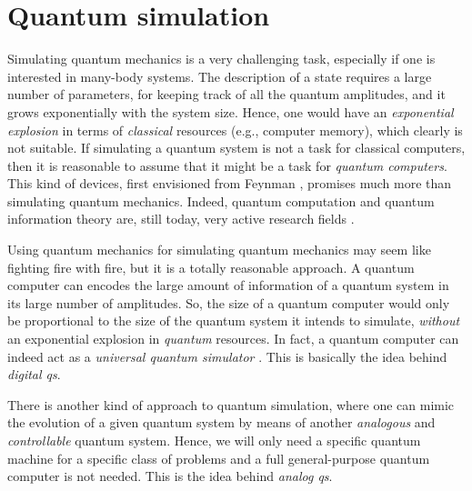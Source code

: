 \section{Quantum simulation}
\label{sec:quantum_simulation}

Simulating quantum mechanics is a very challenging task, especially if one is interested in many-body systems.
The description of a state requires a large number of parameters, for keeping track of all the quantum amplitudes, and it grows exponentially with the system size.
Hence, one would have an \emph{exponential explosion} in terms of \emph{classical} resources (e.g., computer memory), which clearly is not suitable.
If simulating a quantum system is not a task for classical computers, then it is reasonable to assume that it might be a task for \emph{quantum computers}.
This kind of devices, first envisioned from Feynman \cite{feynman2018simulating}, promises much more than simulating quantum mechanics.
Indeed, quantum computation and quantum information theory are, still today, very active research fields \citneeded.

Using quantum mechanics for simulating quantum mechanics may seem like fighting fire with fire, but it is a totally reasonable approach.
A quantum computer can encodes the large amount of information of a quantum system in its large number of amplitudes.
So, the size of a quantum computer would only be proportional to the size of the quantum system it intends to simulate, \emph{without} an exponential explosion in \emph{quantum} resources.
In fact, a quantum computer can indeed act as a \emph{universal quantum simulator} \cite{lloyd1996simulator}.
This is basically the idea behind \emph{digital \acl{qs}}.

There is another kind of approach to quantum simulation, where one can mimic the evolution of a given quantum system by means of another \emph{analogous} and \emph{controllable} quantum system.
Hence, we will only need a specific quantum machine for a specific class of problems and a full general-purpose quantum computer is not needed.
This is the idea behind \emph{analog \acl{qs}}.

